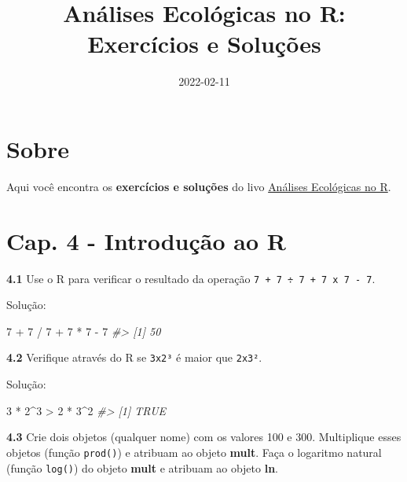 \documentclass[
]{book}
\title{Análises Ecológicas no R: Exercícios e Soluções}
\author{}
\date{\vspace{-2.5em}2022-02-11}
\newenvironment{Shaded}{\begin{snugshade}}{\end{snugshade}}
\newcommand{\CommentTok}[1]{\textcolor[rgb]{0.56,0.35,0.01}{\textit{#1}}}
\newcommand{\DecValTok}[1]{\textcolor[rgb]{0.00,0.00,0.81}{#1}}
\newcommand{\SpecialCharTok}[1]{\textcolor[rgb]{0.00,0.00,0.00}{#1}}
\begin{document}
\maketitle

{
\setcounter{tocdepth}{1}
\tableofcontents
}
\hypertarget{sobre}{%
\chapter*{Sobre}\label{sobre}}

Aqui você encontra os \textbf{exercícios e soluções} do livo \href{https://analises-ecologicas.netlify.app/}{Análises Ecológicas no R}.

\hypertarget{cap.-4---introduuxe7uxe3o-ao-r}{%
\chapter*{Cap. 4 - Introdução ao R}\label{cap.-4---introduuxe7uxe3o-ao-r}}

\textbf{4.1}
Use o R para verificar o resultado da operação \texttt{7\ +\ 7\ ÷\ 7\ +\ 7\ x\ 7\ -\ 7}.

Solução:

\begin{Shaded}
\begin{Highlighting}[]
\DecValTok{7} \SpecialCharTok{+} \DecValTok{7} \SpecialCharTok{/} \DecValTok{7} \SpecialCharTok{+} \DecValTok{7} \SpecialCharTok{*} \DecValTok{7} \SpecialCharTok{{-}} \DecValTok{7}
\CommentTok{\#\textgreater{} [1] 50}
\end{Highlighting}
\end{Shaded}

\textbf{4.2}
Verifique através do R se \texttt{3x2³} é maior que \texttt{2x3²}.

Solução:

\begin{Shaded}
\begin{Highlighting}[]
\DecValTok{3} \SpecialCharTok{*} \DecValTok{2}\SpecialCharTok{\^{}}\DecValTok{3} \SpecialCharTok{\textgreater{}} \DecValTok{2} \SpecialCharTok{*} \DecValTok{3}\SpecialCharTok{\^{}}\DecValTok{2}
\CommentTok{\#\textgreater{} [1] TRUE}
\end{Highlighting}
\end{Shaded}

\textbf{4.3}
Crie dois objetos (qualquer nome) com os valores 100 e 300. Multiplique esses objetos (função \texttt{prod()}) e atribuam ao objeto \textbf{mult}. Faça o logaritmo natural (função \texttt{log()}) do objeto \textbf{mult} e atribuam ao objeto \textbf{ln}.
\end{document}
